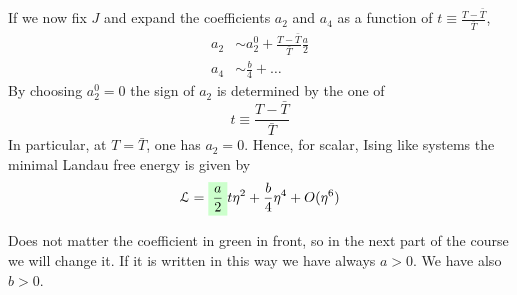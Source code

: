 \documentclass[../main/main.tex]{subfiles}
\begin{document}
If we now fix \( J \) and expand the coefficients \( a_2 \) and \( a_4 \) as a function of \( t \equiv \frac{T - \bar{T} }{\bar{T} } \),
\begin{subequations}
\begin{align}
  a_2 & \sim  a_2^0 +    \frac{T - \bar{T} }{\bar{T} } \frac{a}{2} \\
  a_4 & \sim \frac{b}{4} + \dots
\end{align}
\end{subequations}
By choosing \( a_2^0 = 0\) the sign of \( a_2 \) is determined by the one of
\begin{equation}
  t \equiv \frac{T - \bar{T} }{\bar{T} }
\end{equation}
In particular, at \( T = \bar{T}  \), one has \( a_2 =0 \).
Hence, for scalar, Ising like systems the minimal Landau free energy is given by
\begin{equation}
    \mathcal{L} = \mathcolorbox{green!20}{\frac{a}{2}} t  \eta ^2 + \frac{b}{4} \eta ^4 + O ( \eta ^6)
\end{equation}
\begin{remark}
Does not matter the coefficient in green in front, so in the next part of the course we will change it. If it is written in this way we have always \( a>0 \). We have also \( b>0 \).
\end{remark}
\end{document}
